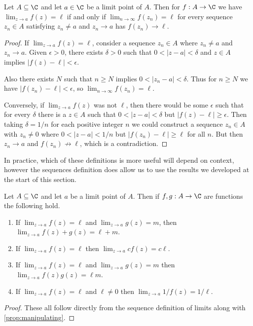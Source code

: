 \documentclass[a4paper]{scrartcl}
\begin{document}
\begin{proposition}
	Let $A \subseteq \C$ and let $a \in \C$ be a limit point of $A$. Then for $f:A \rightarrow \C$ we have $\displaystyle\lim_{z \to a} f(z) = \ell$ if and only if $\lim_{n \to \infty} f(z_n) = \ell$ for every sequence $z_n \in A$ satisfying $z_n \neq a$ and $z_n \rightarrow a$ has $f(z_n) \rightarrow \ell$.
\end{proposition}
\begin{proof}
If $\lim_{z \to a} f(z) = \ell$, consider a sequence $z_n \in A$ where $z_n \neq a$ and $z_n \rightarrow a$.
Given $\epsilon > 0$, there exists $\delta > 0$ such that $0 < |z - a| < \delta$ and $z \in A$ implies $|f(z) - \ell| < \epsilon$.

Also there exists $N$ such that $n \geq N$ implies $0 < |z_n - a| < \delta$. Thus for $n \geq N$ we have $|f(z_n) - \ell| < \epsilon$, so $\lim_{n \to \infty} f(z_n) = \ell$. 

Conversely, if $\lim_{z \to a} f(z)$ was not $\ell$, then there would be some $\epsilon$ such that for every $\delta$ there is a $z \in A$ such that $0 < |z - a| < \delta$ but $|f(z) - \ell| \geq \epsilon$. Then taking $\delta = 1/n$ for each positive integer $n$ we could construct a sequence $z_n \in A$ with $z_n \neq 0$ where $0 < |z - a| < 1/n$ but $|f(z_n) - \ell| \geq \ell$ for all $n$. But then $z_n \rightarrow a$ and $f(z_n) \not \rightarrow \ell$, which is a contradiction. 
\end{proof}


In practice, which of these definitions is more useful will depend on context, however the sequences definition does allow us to use the results we developed at the start of this section. 

\begin{proposition}
	Let $A \subseteq \C$ and let $a$ be a limit point of $A$. Then if $f, g: A \rightarrow \C$ are functions the following hold.
	\begin{enumerate}[label=(\roman*)]
		\item If $\lim_{z \to a} f(z) = \ell$ and $\lim_{z \to a} g(z) = m$, then $\lim_{z \to a} f(z) + g(z) = \ell + m$.
		\item If $\lim_{z \to a} f(z) = \ell$ then $\lim_{z \to a} cf(z) = c\ell$.
		\item If $\lim_{z \to a} f(z) = \ell$ and $\lim_{z \to a} g(z) = m$ then $\lim_{z \to a} f(z)g(z) = \ell m$.
		\item If $\lim_{z \to a} f(z) = \ell$ and $\ell \neq 0$ then $\lim_{z \to a} 1/f(z) = 1/\ell$.
	\end{enumerate}
\end{proposition}
\begin{proof}
	These all follow directly from the sequence definition of limits along with \autoref{prop:manipulating}.
\end{proof}
\end{document}
